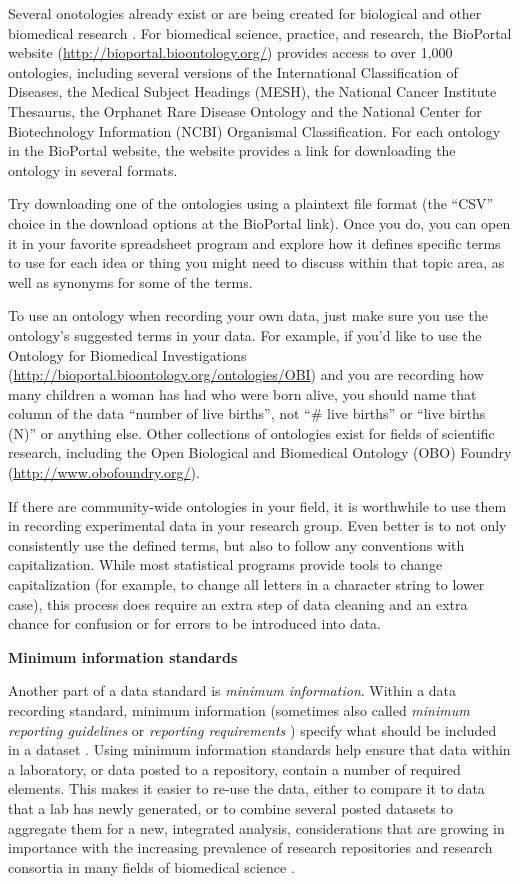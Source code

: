 \documentclass[]{tufte-book}
\begin{document}
Several onotologies already exist or are being created for biological and other
biomedical research \citep{ghosh2011software}. For biomedical science, practice, and
research, the BioPortal website (\url{http://bioportal.bioontology.org/}) provides
access to over 1,000 ontologies, including several versions of the International
Classification of Diseases, the Medical Subject Headings (MESH), the National
Cancer Institute Thesaurus, the Orphanet Rare Disease Ontology and the National
Center for Biotechnology Information (NCBI) Organismal Classification. For each
ontology in the BioPortal website, the website provides a link for downloading
the ontology in several formats.

Try downloading one of the ontologies using a plaintext file format (the ``CSV''
choice in the download options at the BioPortal link). Once you do, you can open
it in your favorite spreadsheet program and explore how it defines specific
terms to use for each idea or thing you might need to discuss within that topic
area, as well as synonyms for some of the terms.

To use an ontology when recording your own data, just make sure you use the
ontology's suggested terms in your data. For example, if you'd like to use the
Ontology for Biomedical Investigations
(\url{http://bioportal.bioontology.org/ontologies/OBI}) and you are recording how many
children a woman has had who were born alive, you should name that column of the
data ``number of live births'', not ``\# live births'' or ``live births (N)'' or
anything else. Other collections of ontologies exist for fields of scientific
research, including the Open Biological and Biomedical Ontology (OBO) Foundry
(\url{http://www.obofoundry.org/}).

If there are community-wide ontologies in your field, it is worthwhile to use
them in recording experimental data in your research group. Even better is to
not only consistently use the defined terms, but also to follow any conventions
with capitalization. While most statistical programs provide tools to change
capitalization (for example, to change all letters in a character string to
lower case), this process does require an extra step of data cleaning and an
extra chance for confusion or for errors to be introduced into data.

\textbf{Minimum information standards}

Another part of a data standard is \emph{minimum information}. Within a data
recording standard, minimum information (sometimes also called \emph{minimum
reporting guidelines} \citep{sansone2012toward} or \emph{reporting requirements}
\citep{brazma2006standards}) specify what should be included in a dataset
\citep{ghosh2011software}. Using minimum information standards help ensure that data
within a laboratory, or data posted to a repository, contain a number of
required elements. This makes it easier to re-use the data, either to compare it
to data that a lab has newly generated, or to combine several posted datasets to
aggregate them for a new, integrated analysis, considerations that are growing
in importance with the increasing prevalence of research repositories and
research consortia in many fields of biomedical science \citep{keller2017evolution}.
\end{document}
